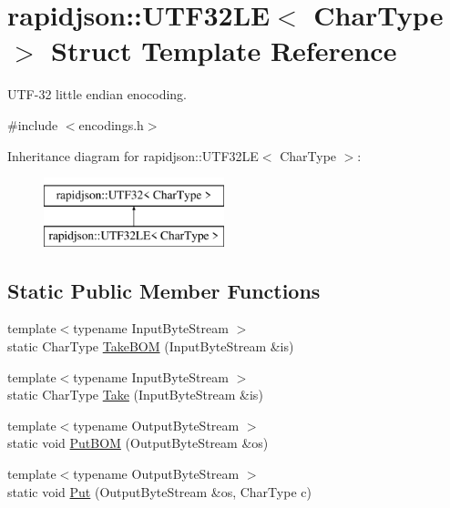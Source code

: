 \hypertarget{structrapidjson_1_1_u_t_f32_l_e}{}\section{rapidjson\+::U\+T\+F32\+LE$<$ Char\+Type $>$ Struct Template Reference}
\label{structrapidjson_1_1_u_t_f32_l_e}


U\+T\+F-\/32 little endian enocoding.  




{\ttfamily \#include $<$encodings.\+h$>$}

Inheritance diagram for rapidjson\+::U\+T\+F32\+LE$<$ Char\+Type $>$\+:\begin{figure}[H]
\begin{center}
\leavevmode
\includegraphics[height=2.000000cm]{structrapidjson_1_1_u_t_f32_l_e}
\end{center}
\end{figure}
\subsection*{Static Public Member Functions}
\begin{DoxyCompactItemize}
\item 
{\footnotesize template$<$typename Input\+Byte\+Stream $>$ }\\static Char\+Type \mbox{\hyperlink{structrapidjson_1_1_u_t_f32_l_e_acb8b08dd8eeb7f6afb97121bdb885f1c}{Take\+B\+OM}} (Input\+Byte\+Stream \&is)
\item 
{\footnotesize template$<$typename Input\+Byte\+Stream $>$ }\\static Char\+Type \mbox{\hyperlink{structrapidjson_1_1_u_t_f32_l_e_af98499035db768f4c90be2d8dcc7a704}{Take}} (Input\+Byte\+Stream \&is)
\item 
{\footnotesize template$<$typename Output\+Byte\+Stream $>$ }\\static void \mbox{\hyperlink{structrapidjson_1_1_u_t_f32_l_e_a97283ce5030af50eb964f6e5fe46b7ff}{Put\+B\+OM}} (Output\+Byte\+Stream \&os)
\item 
{\footnotesize template$<$typename Output\+Byte\+Stream $>$ }\\static void \mbox{\hyperlink{structrapidjson_1_1_u_t_f32_l_e_ae8b1fef6e3bcfe8899f228d7a00ee98c}{Put}} (Output\+Byte\+Stream \&os, Char\+Type c)
\end{DoxyCompactItemize}
